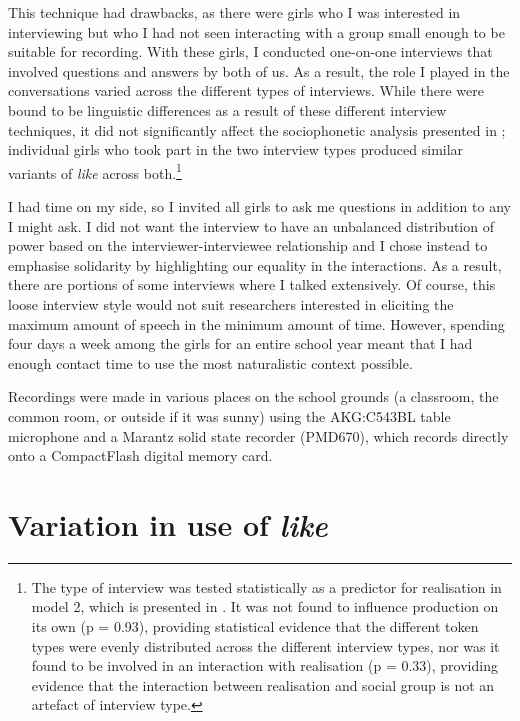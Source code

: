 This technique had drawbacks, as there were girls who I was interested in interviewing but who I had not seen interacting with a group small enough to be suitable for recording. With these girls, I conducted one-on-one interviews that involved questions and answers by both of us. As a result, the role I played in the conversations varied across the different types of interviews. While there were bound to be linguistic differences as a result of these different interview techniques, it did not significantly affect the sociophonetic analysis presented in ; individual girls who took part in the two interview types produced similar variants of \textit{like} across both.\footnote{The type of interview was tested statistically as a predictor for realisation in model 2, which is presented in . It was not found to influence production on its own (p = 0.93), providing statistical evidence that the different token types were evenly distributed across the different interview types, nor was it found to be involved in an interaction with  realisation (p = 0.33), providing evidence that the interaction between  realisation and social group is not an artefact of interview type.} 

I had time on my side, so I invited all girls to ask me questions in addition to any I might ask. I did not want the interview to have an unbalanced distribution of power based on the interviewer-interviewee relationship and I chose instead to emphasise solidarity by highlighting our equality in the interactions. As a result, there are portions of some interviews where I talked extensively. Of course, this loose interview style would not suit researchers interested in eliciting the maximum amount of speech in the minimum amount of time. However, spending four days a week among the girls for an entire school year meant that I had enough contact time to use the most naturalistic context possible.

Recordings were made in various places on the school grounds (a classroom, the common room, or outside if it was sunny) using the AKG:C543BL table microphone  and a Marantz solid state recorder (PMD670), which records directly onto a CompactFlash digital memory card. 


\section{Variation in use of \textit{like}}\label{prod-like}


